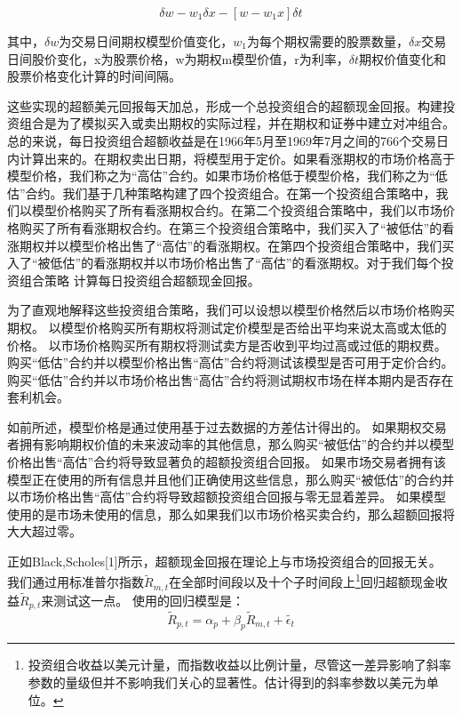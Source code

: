 \begin{equation}
    \delta{w}-w_1\delta{x}-[w-w_1x]\delta{t}
\end{equation}
\par{
    其中，$\delta{w}$为交易日间期权模型价值变化，$w_1$为每个期权需要的股票数量，$\delta{x}$交易日间股价变化，x为股票价格，w为期权m模型价值，r为利率，$\delta{t}$期权价值变化和股票价格变化计算的时间间隔。
}
\par{
    这些实现的超额美元回报每天加总，形成一个总投资组合的超额现金回报。构建投资组合是为了模拟买入或卖出期权的实际过程，并在期权和证券中建立对冲组合。总的来说，每日投资组合超额收益是在1966年5月至1969年7月之间的766个交易日内计算出来的。在期权卖出日期，将模型用于定价。如果看涨期权的市场价格高于模型价格，我们称之为“高估”合约。如果市场价格低于模型价格，我们称之为“低估”合约。我们基于几种策略构建了四个投资组合。在第一个投资组合策略中，我们以模型价格购买了所有看涨期权合约。在第二个投资组合策略中，我们以市场价格购买了所有看涨期权合约。在第三个投资组合策略中，我们买入了“被低估”的看涨期权并以模型价格出售了“高估”的看涨期权。在第四个投资组合策略中，我们买入了“被低估”的看涨期权并以市场价格出售了“高估”的看涨期权。对于我们每个投资组合策略
计算每日投资组合超额现金回报。
}
\par{
    为了直观地解释这些投资组合策略，我们可以设想以模型价格然后以市场价格购买期权。 以模型价格购买所有期权将测试定价模型是否给出平均来说太高或太低的价格。 以市场价格购买所有期权将测试卖方是否收到平均过高或过低的期权费。 购买“低估”合约并以模型价格出售“高估”合约将测试该模型是否可用于定价合约。 购买“低估”合约并以市场价格出售“高估”合约将测试期权市场在样本期内是否存在套利机会。
}
\par{
    如前所述，模型价格是通过使用基于过去数据的方差估计得出的。 如果期权交易者拥有影响期权价值的未来波动率的其他信息，那么购买“被低估”的合约并以模型价格出售“高估”合约将导致显著负的超额投资组合回报。 如果市场交易者拥有该模型正在使用的所有信息并且他们正确使用这些信息，那么购买“被低估”的合约并以市场价格出售“高估”合约将导致超额投资组合回报与零无显着差异。 如果模型使用的是市场未使用的信息，那么如果我们以市场价格买卖合约，那么超额回报将大大超过零。
}
\par{
    正如Black,Scholes[1]所示，超额现金回报在理论上与市场投资组合的回报无关。 我们通过用标准普尔指数$\tilde{R}_{m,t}$在全部时间段以及十个子时间段上\footnote{
        投资组合收益以美元计量，而指数收益以比例计量，尽管这一差异影响了斜率参数的量级但并不影响我们关心的显著性。估计得到的斜率参数以美元为单位。
    }回归超额现金收益$\tilde{R}_{p,t}$来测试这一点。 使用的回归模型是：
}
\begin{equation}
    \tilde{R}_{p,t}=\alpha_p+\beta_p\tilde{R}_{m,t}+\tilde{\epsilon_t}
\end{equation}
